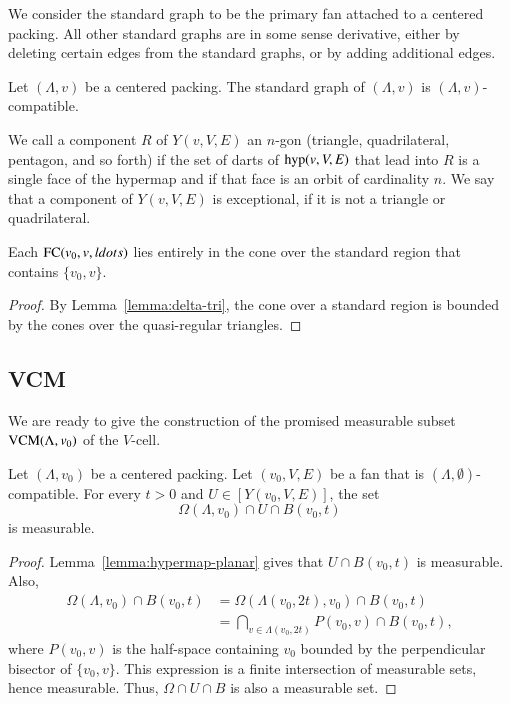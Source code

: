 We consider the standard graph  to be the
primary fan attached to a centered packing.  All other
standard graphs are in some sense derivative, either by deleting
certain edges from the standard graphs, or by adding additional
edges.


\begin{lemma}
Let $(\Lambda,v)$ be a centered packing.  The standard graph
of $(\Lambda,v)$ is $(\Lambda,v)$-compatible.
\end{lemma}

\begin{definition}  We call a component $R$ of $Y(v,V,E)$ an
$n$-gon (triangle, quadrilateral, pentagon, and so forth) if
the set of darts of ${\operatorname{hyp}}(v,V,E)$ that lead into $R$ is
a single face of the hypermap and if that face is an orbit of
cardinality $n$.   We say that
a component of $Y(v,V,E)$ is exceptional, if it is not a
triangle or quadrilateral.
\end{definition}


\begin{lemma}
Each ${\operatorname{FC}}(v_0,v,ldots)$ lies entirely in the cone over the standard
region that contains $\{v_0,v\}$.
\end{lemma}

\begin{proof}
By Lemma~\ref{lemma:delta-tri},
the cone over a standard region is bounded by the cones  over the
quasi-regular triangles.
\end{proof}

\subsection{VCM}
\label{sec:VCM}

We are ready to give 
the construction of the promised measurable subset ${\operatorname{VCM}}(\Lambda,v_0)$ of the $V$-cell.


\begin{lemma}
Let $(\Lambda,v_0)$ be a centered packing.  Let $(v_0,V,E)$ be a fan
that is $(\Lambda,\emptyset)$-compatible.  For every $t>0$ and
$U\in[Y(v_0,V,E)]$, the set
  $$
  \Omega(\Lambda,v_0)\cap U \cap B(v_0,t)
  $$
is measurable.
\end{lemma}

\begin{proof}  Lemma~\ref{lemma:hypermap-planar} 
gives that $U\cap B(v_0,t)$ is measurable.
Also,
  $$
  \begin{array}{lll}
  \Omega(\Lambda,v_0)\cap B(v_0,t) &= \Omega(\Lambda(v_0,2t),v_0) 
    \cap B(v_0,t) \\
    &= \bigcap _{v\in\Lambda(v_0,2t)} P(v_0,v) \cap B(v_0,t),
  \end{array}
  $$
where $P(v_0,v)$ is the half-space containing $v_0$ bounded by the
perpendicular bisector of $\{v_0,v\}$.  This expression is a finite
intersection of measurable sets, hence measurable.  Thus, $\Omega\cap U\cap B$ is also a measurable set.
\end{proof}

